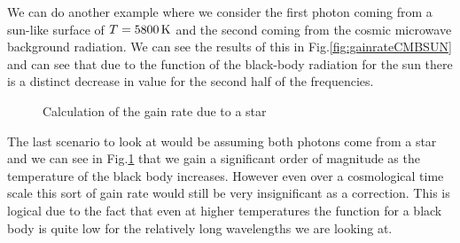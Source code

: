 We can do another example where we consider the first photon coming from a sun-like surface of $T=5800\,\rm{K}$ and the second coming from the cosmic microwave background radiation. We can see the results of this in Fig.\ref{fig:gainrateCMBSUN} and can see that due to the function of the black-body radiation for the sun there is a distinct decrease in value for the second half of the frequencies.
\begin{figure}
    \centering
    \caption{Calculation of the gain rate due to a star}
    \label{fig:gainrateSUNSUN}
\end{figure}
The last scenario to look at would be assuming both photons come from a star and we can see in Fig.\ref{fig:gainrateSUNSUN} that we gain a significant order of magnitude as the temperature of the black body increases. However even over a cosmological time scale this sort of gain rate would still be very insignificant as a correction. This is logical due to the fact that even at higher temperatures the function for a black body is quite low for the relatively long wavelengths we are looking at.

